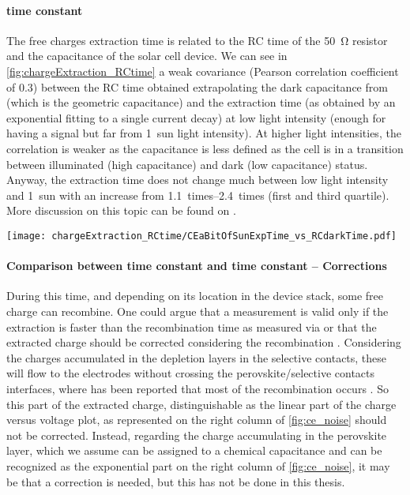 \paragraph{ time constant}
The free charges extraction time is related to the RC time of the \SI{50}{\ohm} resistor and the capacitance of the solar cell device. We can see in \cref{fig:chargeExtraction_RCtime} a weak covariance (Pearson correlation coefficient of 0.3) between the RC time obtained extrapolating the dark capacitance from  (which is the geometric capacitance) and the extraction time (as obtained by an exponential fitting to a single  current decay) at low light intensity (enough for having a signal but far from 1~sun light intensity). At higher light intensities, the correlation is weaker as the capacitance is less defined as the cell is in a transition between illuminated (high capacitance) and dark (low capacitance) status. Anyway, the extraction time does not change much between low light intensity and 1~sun with an increase from \SIrange{1.1}{2.4}{times} (first and third quartile). More discussion on this topic can be found on .

\begin{SCfigure}%
	\centering
	\texttt{[image: chargeExtraction\_RCtime/CEaBitOfSunExpTime\_vs\_RCdarkTime.pdf]}
	\label{fig:chargeExtraction_RCtime}
\end{SCfigure}

\paragraph{Comparison between  time constant and  time constant -- Corrections} 
During this time, and depending on its location in the device stack, some free charge can recombine. One could argue that a  measurement is valid only if the extraction is faster than the recombination time as measured via  \cite{Ryan2017a} or that the extracted charge should be corrected considering the recombination \cite{Credgington2011}. Considering the charges accumulated in the depletion layers in the selective contacts, these will flow to the electrodes without crossing the perovskite/selective contacts interfaces, where has been reported that most of the recombination occurs \cite{Barnea-Nehoshtan2014,Stolterfoht2018a,Stolterfoht2018}. So this part of the extracted charge, distinguishable as the linear part of the charge versus voltage plot, as represented on the right column of \cref{fig:ce_noise} should not be corrected. Instead, regarding the charge accumulating in the perovskite layer, which we assume can be assigned to a chemical capacitance and can be recognized as the exponential part on the right column of \cref{fig:ce_noise}, it may be that a correction \cite{Shuttle2008a,Shuttle2008b} is needed, but this has not be done in this thesis. 

